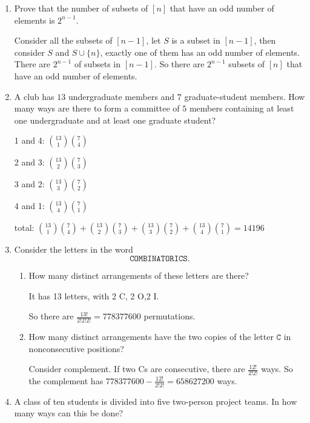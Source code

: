 \documentclass[11pt]{article}
\begin{document}
\begin{enumerate}
All digit has 10 ways to choose, however the first digit cannot be 0, so it has 9 choices. We choose digit one by one. The first has 9 choice, the second has 10-1=9 choice, and so on. So there are $9\times9\times8\times7\times6\times5=136080$ numbers.

\item
Prove that the number of subsets of $[n]$ that have an odd number of elements is $2^{n-1}$.

Consider all the subsets of $[n-1]$, let $S$ is a subset in $[n-1]$, then consider $S$ and $S \cup \{n\}$, exactly one of them has an odd number of elements. There are $2^{n-1}$ of subsets in $[n-1]$. So there are $2^{n-1}$ subsets of $[n]$ that have an odd number of elements.

\item
A club has \(13\) undergraduate members and \(7\) graduate-student members. How many ways are there to form a committee of \(5\) members containing at least one undergraduate and at least one graduate student?

1 and 4: $\binom{13}{1} \binom{7}{4}$

2 and 3: $\binom{13}{2} \binom{7}{3}$

3 and 2: $\binom{13}{3} \binom{7}{2}$

4 and 1: $\binom{13}{4} \binom{7}{1}$

total: $\binom{13}{1} \binom{7}{4}+\binom{13}{2} \binom{7}{3}+\binom{13}{3} \binom{7}{2}+\binom{13}{4} \binom{7}{1}=14196$

\item
Consider the letters in the word
\[
\texttt{COMBINATORICS}.
\]

\begin{enumerate}
    \item How many distinct arrangements of these letters are there?

    It has 13 letters, with 2 C, 2 O,2 I.

    So there are $\frac{13!}{2!2!2!}=778377600$ permutations.
    
    \item How many distinct arrangements have the two copies of the letter \(\texttt{C}\) in nonconsecutive positions?

    Consider complement. If two Cs are consecutive, there are $\frac{12!}{2!2!}$ ways. So the complement has $778377600-\frac{12!}{2!2!}=658627200$ ways.
\end{enumerate}

\item
A class of ten students is divided into five two-person project teams. In how many ways can this be done?


\end{enumerate}
\end{document}
